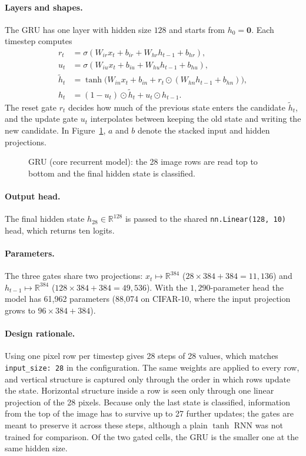 \paragraph{Layers and shapes.} The GRU has one layer with hidden size $128$ and
starts from $h_0=\mathbf{0}$. Each timestep computes
\begin{align*}
 r_t&=\sigma(W_{ir}x_t+b_{ir}+W_{hr}h_{t-1}+b_{hr}),\\
 u_t&=\sigma(W_{iu}x_t+b_{iu}+W_{hu}h_{t-1}+b_{hu}),\\
 \tilde h_t&=\tanh\bigl(W_{in}x_t+b_{in}+r_t\odot(W_{hn}h_{t-1}+b_{hn})\bigr),\\
 h_t&=(1-u_t)\odot\tilde h_t+u_t\odot h_{t-1}.
\end{align*}
The reset gate $r_t$ decides how much of the previous state enters the candidate
$\tilde h_t$, and the update gate $u_t$ interpolates between keeping the old
state and writing the new candidate. In Figure~\ref{fig:model-gru}, $a$ and $b$
denote the stacked input and hidden projections.

\begin{figure}[htbp]
\centering

\caption{GRU (core recurrent model): the 28 image rows are read top to bottom
and the final hidden state is classified.}
\label{fig:model-gru}
\end{figure}

\paragraph{Output head.} The final hidden state $h_{28}\in\mathbb{R}^{128}$ is
passed to the shared \texttt{nn.Linear(128, 10)} head, which returns ten logits.

\paragraph{Parameters.} The three gates share two projections:
$x_t\mapsto\mathbb{R}^{384}$ ($28\times384+384=11{,}136$) and
$h_{t-1}\mapsto\mathbb{R}^{384}$ ($128\times384+384=49{,}536$). With the
$1{,}290$-parameter head the model has 61,962 parameters (88,074 on CIFAR-10,
where the input projection grows to $96\times384+384$).

\paragraph{Design rationale.} Using one pixel row per timestep gives 28 steps
of 28 values, which matches \texttt{input\_size: 28} in the configuration. The
same weights are applied to every row, and vertical structure is captured only
through the order in which rows update the state. Horizontal structure inside a
row is seen only through one linear projection of the 28 pixels. Because only
the last state is classified, information from the top of the image has to
survive up to 27 further updates; the gates are meant to preserve it across
these steps, although a plain $\tanh$ RNN was not trained for comparison. Of the
two gated cells, the GRU is the smaller one at the same hidden size.

